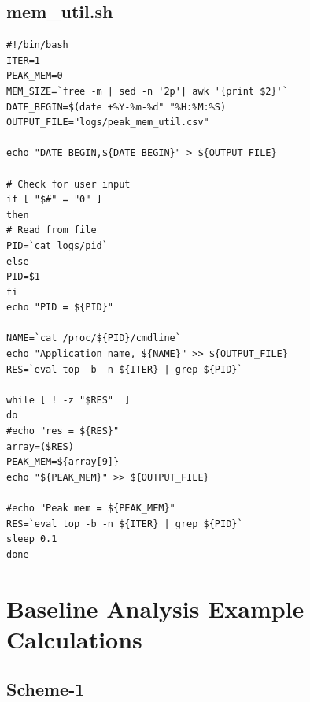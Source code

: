 \section{mem\_util.sh}
\label{app:code:mem_util}
\begin{lstlisting}[caption=Peak Memory Utilization]
#!/bin/bash
ITER=1
PEAK_MEM=0
MEM_SIZE=`free -m | sed -n '2p'| awk '{print $2}'`
DATE_BEGIN=$(date +%Y-%m-%d" "%H:%M:%S)
OUTPUT_FILE="logs/peak_mem_util.csv"

echo "DATE BEGIN,${DATE_BEGIN}" > ${OUTPUT_FILE}

# Check for user input
if [ "$#" = "0" ]
then
# Read from file
PID=`cat logs/pid`
else
PID=$1
fi
echo "PID = ${PID}"

NAME=`cat /proc/${PID}/cmdline`
echo "Application name, ${NAME}" >> ${OUTPUT_FILE}
RES=`eval top -b -n ${ITER} | grep ${PID}`

while [ ! -z "$RES"  ]
do
#echo "res = ${RES}"
array=($RES)
PEAK_MEM=${array[9]}
echo "${PEAK_MEM}" >> ${OUTPUT_FILE}

#echo "Peak mem = ${PEAK_MEM}"
RES=`eval top -b -n ${ITER} | grep ${PID}`
sleep 0.1
done
\end{lstlisting}
\cleardoublepage

\chapter{Baseline Analysis Example Calculations}
\label{app:ba:calc:scheme1}

\section{Scheme-1}
